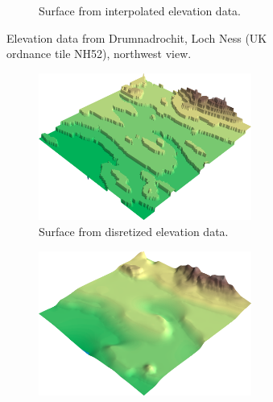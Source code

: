 \documentclass[a4paper,10pt]{report}
\begin{document}
\begin{figure}[H]
\begin{subfigure}{\textwidth}
\begin{subfigure}{.49\textwidth}
        \addtocounter{subfigure}{-1}
        \renewcommand\thesubfigure{\alph{subfigure}) ii}
        \caption{Surface from interpolated elevation data.}
        \end{subfigure}
        \addtocounter{subfigure}{-1}
        \renewcommand\thesubfigure{\alph{subfigure}}
        \caption{Elevation data from Drumnadrochit, Loch Ness (UK ordnance tile NH52), northwest view.}
        \label{fig:3D_discretized_interpolation_a}
    \end{subfigure}
    \begin{subfigure}{\textwidth}
        \centering
        \begin{subfigure}{.49\textwidth}
            \includegraphics[width=\textwidth]{../images/NO33/2D_Data_Interpolation_3D_discretized_datagrid.png}
        \renewcommand\thesubfigure{\alph{subfigure}) i}
        \caption{Surface from disretized elevation data.}
        \end{subfigure}
        \hfill
        \begin{subfigure}{.49\textwidth}
            \includegraphics[width=\textwidth]{../images/NO33/2D_Data_Interpolation_3D_discretized_datagrid_interpolated.png}

\end{subfigure}
\end{subfigure}
\end{figure}
\end{document}
